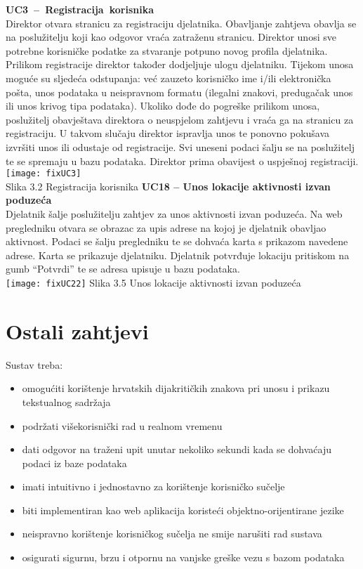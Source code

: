 				\noindent \textbf{UC3 – Registracija korisnika\\}
				Direktor otvara stranicu za registraciju djelatnika. Obavljanje zahtjeva obavlja se na poslužitelju koji kao odgovor vraća zatraženu stranicu. Direktor unosi sve potrebne korisničke podatke za stvaranje potpuno novog profila djelatnika. Prilikom registracije direktor također dodjeljuje ulogu djelatniku. Tijekom unosa moguće su sljedeća odstupanja: već zauzeto korisničko ime i/ili elektronička pošta, unos podataka u neispravnom formatu (ilegalni znakovi, predugačak unos ili unos krivog tipa podataka). Ukoliko dođe do pogreške prilikom unosa, poslužitelj obavještava direktora o neuspjelom zahtjevu i vraća ga na stranicu za registraciju. U takvom slučaju direktor ispravlja unos te ponovno pokušava izvršiti unos ili odustaje od registracije. Svi uneseni podaci šalju se na poslužitelj te se spremaju u bazu podataka. Direktor prima obavijest o uspješnoj registraciji.\\
				\texttt{[image: fixUC3]}\\
				Slika 3.2 Registracija korisnika
				\eject
				\noindent \textbf{UC18 – Unos lokacije aktivnosti izvan poduzeća\\}
				Djelatnik šalje poslužitelju zahtjev za unos aktivnosti izvan poduzeća. Na web pregledniku otvara se obrazac za upis adrese na kojoj je djelatnik obavljao aktivnost. Podaci se šalju pregledniku te se dohvaća karta s prikazom navedene adrese. Karta se prikazuje djelatniku. Djelatnik potvrđuje lokaciju pritiskom na gumb “Potvrdi” te se adresa upisuje u bazu podataka.\\
				\texttt{[image: fixUC22]}
				Slika 3.5 Unos lokacije aktivnosti izvan poduzeća
				\eject
	
		\section{Ostali zahtjevi}
		 	
		 	\noindent Sustav treba:
			 \begin{itemize}
			 	\item omogućiti korištenje hrvatskih dijakritičkih znakova pri unosu i prikazu tekstualnog sadržaja
			 	\item podržati višekorisnički rad u realnom vremenu
			 	\item dati odgovor na traženi upit unutar nekoliko sekundi kada se dohvaćaju podaci iz baze podataka
			 	\item imati intuitivno i jednostavno za korištenje korisničko sučelje
			 	\item biti implementiran kao web aplikacija koristeći objektno-orijentirane jezike
			 	\item neispravno korištenje korisničkog sučelja ne smije narušiti rad sustava
			 	\item osigurati sigurnu, brzu i otpornu na vanjske greške vezu s bazom podataka
			 \end{itemize}
			 
			 
			 
	